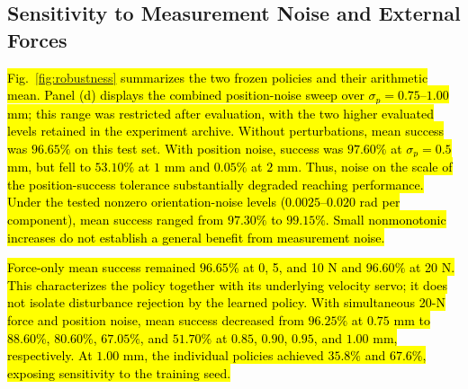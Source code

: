 \begingroup
\subsection{Sensitivity to Measurement Noise and External Forces}
\hl{Fig.~\ref{fig:robustness} summarizes the two frozen policies and their arithmetic mean. Panel (d) displays the combined position-noise sweep over $\sigma_p=0.75$--$1.00$ mm; this range was restricted after evaluation, with the two higher evaluated levels retained in the experiment archive. Without perturbations, mean success was $96.65\%$ on this test set. With position noise, success was $97.60\%$ at $\sigma_p=0.5$ mm, but fell to $53.10\%$ at $1$ mm and $0.05\%$ at $2$ mm. Thus, noise on the scale of the position-success tolerance substantially degraded reaching performance. Under the tested nonzero orientation-noise levels ($0.0025$--$0.020$ rad per component), mean success ranged from $97.30\%$ to $99.15\%$. Small nonmonotonic increases do not establish a general benefit from measurement noise.}

\hl{Force-only mean success remained $96.65\%$ at 0, 5, and 10 N and $96.60\%$ at 20 N. This characterizes the policy together with its underlying velocity servo; it does not isolate disturbance rejection by the learned policy. With simultaneous 20-N force and position noise, mean success decreased from $96.25\%$ at $0.75$ mm to $88.60\%$, $80.60\%$, $67.05\%$, and $51.70\%$ at $0.85$, $0.90$, $0.95$, and $1.00$ mm, respectively. At $1.00$ mm, the individual policies achieved $35.8\%$ and $67.6\%$, exposing sensitivity to the training seed.}
\par\endgroup
